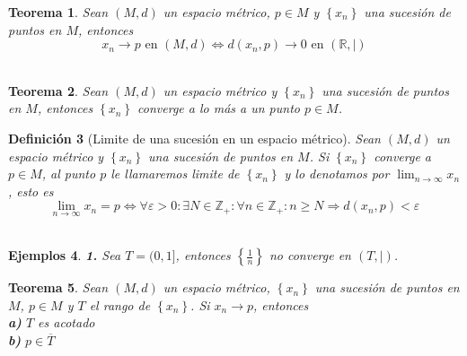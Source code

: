 \documentclass[oneside]{book} %
\theoremstyle{Teorema}
\newtheorem{Definicion}{Definición}[chapter]
\newtheorem{Teorema}[Definicion]{Teorema}
\theoremstyle{Ejemplos}
\newtheorem{Ejemplos}[Definicion]{Ejemplos}
\theoremstyle{[Obs]}
\newcommand{\absSymbol}{\left|\right.} %
\renewcommand{\{}{\left\lbrace} %
\renewcommand{\}}{\right\rbrace} %
\newcommand{\R}{\mathbb{R}} %
\begin{document}
			\begin{Teorema}
				
				Sean $(M, d)$ un espacio métrico, $p \in M$ y $\{ x_n \}$ una sucesión de puntos en $M$, entonces \\

				\[ x_n \to p \text{ en } (M, d) \Leftrightarrow d(x_n, p) \to 0 \text{ en } (\R, \absSymbol) \] \\

			\end{Teorema}

			\begin{Teorema}
				
				Sean $(M, d)$ un espacio métrico y $\{ x_n \}$ una sucesión de puntos en $M$, entonces $\{ x_n \}$ converge a lo más a un punto $p \in M$. \\

			\end{Teorema}

			\begin{Definicion}[Limite de una sucesión en un espacio métrico]
				
				Sean $(M, d)$ un espacio métrico y $\{ x_n \}$ una sucesión de puntos en $M$. Si $\{ x_n \}$ converge a $p \in M$, al punto $p$ le llamaremos limite de $\{ x_n \}$ y lo denotamos por $\displaystyle\lim_{n \to \infty} x_n$, esto es \\

				\[ \displaystyle\lim_{n \to \infty} x_n = p \Leftrightarrow \forall \varepsilon > 0 : \exists N \in \mathbb{Z}_{+} : \forall n \in \mathbb{Z}_{+} : n \geq N \Rightarrow d(x_n, p) < \varepsilon \] \\

			\end{Definicion}

			\begin{Ejemplos}
				
				\hfill

				\textbf{1.} Sea $T = (0, 1]$, entonces $\{ \frac{1}{n} \}$ no converge en $(T, \absSymbol)$. \\ 

			\end{Ejemplos}

			\begin{Teorema}
				
				Sean $(M, d)$ un espacio métrico, $\{ x_n \}$ una sucesión de puntos en $M$, $p \in M$ y $T$ el rango de $\{ x_n \}$. Si $x_n \to p$, entonces \\

				\textbf{a)} $T$ es acotado \\

				\textbf{b)} $p \in \overline{T}$ \\

			\end{Teorema}
\end{document}
